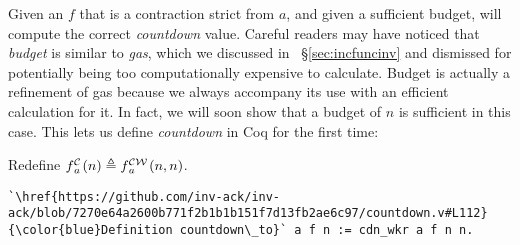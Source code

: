 Given an $f$ that is a contraction strict from $a$,
and given a sufficient budget, 
will compute the correct \emph{countdown} value.
Careful readers may have noticed that \emph{budget} is similar to
\emph{gas}, which we discussed in ~\S\ref{sec:incfuncinv}
and dismissed for potentially
being too computationally expensive to calculate.
Budget is actually a refinement of gas because
we always accompany its use with an efficient calculation for it. 
In fact, we will soon show that a budget of $n$ is sufficient in this case.
This lets us define \emph{countdown} in Coq for the first time:
\begin{defn} \label{defn: countdown}
Redefine $\cdt{f}{a}(n)
\triangleq \cdw{f}{a}(n, n)$.
\begin{lstlisting}
`\href{https://github.com/inv-ack/inv-ack/blob/7270e64a2600b771f2b1b1b151f7d13fb2ae6c97/countdown.v#L112}{\color{blue}Definition countdown\_to}` a f n := cdn_wkr a f n n.
\end{lstlisting}
\vspace{-0.8em}
\end{defn}

